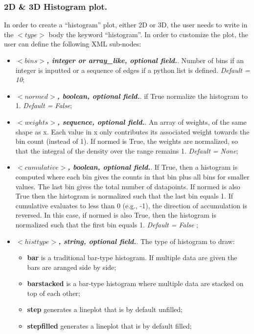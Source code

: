 \subsubsection{2D \& 3D Histogram plot.}
In order to create a ``histogram'' plot, either 2D or 3D, the user needs to write in the $<type>$ body the keyword ``histogram''. In order to customize the plot, the user can define the following XML sub-nodes:
  \begin{itemize}
     \item $<bins>$\textbf{\textit{, integer or array\_like, optional  field.}}. Number of bins if an integer is inputted or a sequence of edges  if a python list is defined. \textit{Default = 10};
     \item $<normed>$\textbf{\textit{, boolean, optional  field.}}. if True normalize the histogram to 1. \textit{Default = False};
     \item $<weights>$\textbf{\textit{, sequence, optional  field.}}. An array of weights, of the same shape as x. Each value in x only contributes its associated weight towards the bin count (instead of 1). If normed is True, the weights are normalized, so that the integral of the density over the range remains 1. \textit{Default = None};
     \item $<cumulative>$\textbf{\textit{, boolean, optional  field.}}. If True, then a histogram is computed where each bin gives the counts in that bin plus all bins for smaller values. The last bin gives the total number of datapoints. If normed is also True then the histogram is normalized such that the last bin equals 1. If cumulative evaluates to less than 0 (e.g., -1), the direction of accumulation is reversed. In this case, if normed is also True, then the histogram is normalized such that the first bin equals 1. \textit{Default = False} ;
     \item $<histtype>$\textbf{\textit{, string, optional  field.}}. The type of histogram to draw:
         \begin{itemize}
         \item \textbf{bar} is a traditional bar-type histogram. If multiple data are given the bars are aranged side by side;
         \item \textbf{barstacked} is a bar-type histogram where multiple data are stacked on top of each other;
         \item \textbf{step} generates a lineplot that is by default unfilled;
         \item \textbf{stepfilled} generates a lineplot that is by default filled;

\end{itemize}
\end{itemize}
